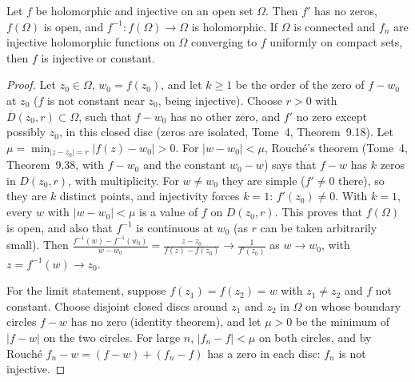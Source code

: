 \begin{lemma}\label{lem:injective}
Let $f$ be holomorphic and injective on an open set $\Omega$. Then $f'$ has no zeros, $f(\Omega)$ is open, and $f^{-1}:f(\Omega)\to\Omega$ is holomorphic. If $\Omega$ is connected and $f_n$ are injective
holomorphic functions on $\Omega$ converging to $f$ uniformly on compact sets, then $f$ is injective or constant.
\end{lemma}
\begin{proof}
Let $z_0\in\Omega$, $w_0=f(z_0)$, and let $k\ge1$ be the order of the zero of $f-w_0$ at $z_0$ ($f$ is not constant near $z_0$, being injective). Choose $r>0$ with $\overline D(z_0,r)\subset\Omega$, such that $f-w_0$
has no other zero, and $f'$ no zero except possibly $z_0$, in this closed disc (zeros are isolated, Tome~4, Theorem~9.18). Let $\mu=\min_{|z-z_0|=r}|f(z)-w_0|>0$. For $|w-w_0|<\mu$, Rouch\'e's theorem
(Tome~4, Theorem~9.38, with $f-w_0$ and the constant $w_0-w$) says that $f-w$ has $k$ zeros in $D(z_0,r)$, with multiplicity. For $w\ne w_0$ they are simple ($f'\ne0$ there), so they are $k$
distinct points, and injectivity forces $k=1$: $f'(z_0)\ne0$. With $k=1$, every $w$ with $|w-w_0|<\mu$ is a value of $f$ on $D(z_0,r)$. This proves that $f(\Omega)$ is open, and also that
$f^{-1}$ is continuous at $w_0$ (as $r$ can be taken arbitrarily small). Then $\frac{f^{-1}(w)-f^{-1}(w_0)}{w-w_0}=\frac{z-z_0}{f(z)-f(z_0)}\to\frac1{f'(z_0)}$ as $w\to w_0$, with $z=f^{-1}(w)\to z_0$.

For the limit statement, suppose $f(z_1)=f(z_2)=w$ with $z_1\ne z_2$ and $f$ not constant. Choose disjoint closed discs around $z_1$ and $z_2$ in $\Omega$ on whose boundary circles $f-w$ has no zero
(identity theorem), and let $\mu>0$ be the minimum of $|f-w|$ on the two circles. For large $n$, $|f_n-f|<\mu$ on both circles, and by Rouch\'e $f_n-w=(f-w)+(f_n-f)$ has a zero in each disc: $f_n$ is not
injective.
\end{proof}

